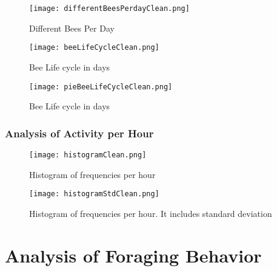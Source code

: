 \documentclass[11pt,fleqn]{book} %
\begin{document}
\begin{figure}[h!]%
\centering%
\texttt{[image: differentBeesPerdayClean.png]}%
\caption{Different Bees Per Day}%
\end{figure}

%


\begin{figure}[h!]%
\centering%
\texttt{[image: beeLifeCycleClean.png]}%
\caption{Bee Life cycle in days}%
\end{figure}

%


\begin{figure}[h!]%
\centering%
\texttt{[image: pieBeeLifeCycleClean.png]}%
\caption{Bee Life cycle in days}%
\end{figure}

%
\subsection*{Analysis of Activity per Hour}%


\begin{figure}[h!]%
\centering%
\texttt{[image: histogramClean.png]}%
\caption{Histogram of frequencies per hour}%
\end{figure}

%


\begin{figure}[h!]%
\centering%
\texttt{[image: histogramStdClean.png]}%
\caption{Histogram of frequencies per hour. It includes standard deviation}%
\end{figure}


\chapter{Analysis of Foraging Behavior}
\end{document}
